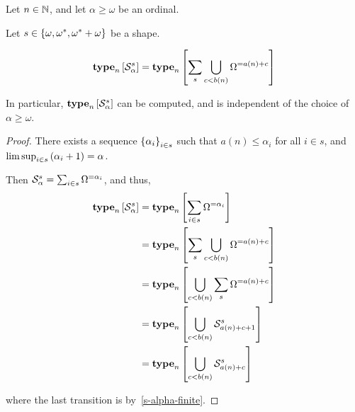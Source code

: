 \begin{corollary}
    Let $n \in \mathbb{N}$, and let $\alpha \ge \omega$ be an ordinal.

    Let $s \in \left\{ {\omega, \omega^\ast, \omega^\ast + \omega} \right\}$ be a shape.

    \[
        \mathbf{type}_{n} \left[ {\mathcal{S}^{s}_{\alpha}} \right]
        = \mathbf{type}_{n} \left[ {\sum_{s} {\bigcup_{c < b(n)}{\Omega^{= a(n) + c}}}} \right]
    \]

    In particular, $\mathbf{type}_{n} \left[ {\mathcal{S}^{s}_{\alpha}} \right]$ can be
    computed, and is independent of the choice of $\alpha \ge \omega$.
\end{corollary}

\begin{proof}
    There exists a sequence $\left\{ {\alpha_i} \right\}_{i \in s}$ such that
    $a(n) \le \alpha_i$ for all $i \in s$,
    and $\limsup_{i \in s} \left( {\alpha_i + 1} \right) = \alpha$.

    Then $\mathcal{S}^{s}_{\alpha} = \sum_{i \in s} \Omega^{= \alpha_i}$,
    and thus,
    \begin{align*}
        \mathbf{type}_{n} \left[ {\mathcal{S}^{s}_{\alpha}} \right]
        &= \mathbf{type}_{n} \left[ {\sum_{i \in s} \Omega^{= \alpha_i}} \right] \\
        &= \mathbf{type}_{n} \left[ {\sum_{s} \bigcup_{c < b(n)}{\Omega^{= a(n) + c}}} \right] \\
        &= \mathbf{type}_{n} \left[ {\bigcup_{c < b(n)}{\sum_{s} \Omega^{= a(n) + c}}} \right] \\
        &= \mathbf{type}_{n} \left[ {\bigcup_{c < b(n)}{\mathcal{S}^{s}_{a(n) + c + 1}}} \right] \\
        &= \mathbf{type}_{n} \left[ {\bigcup_{c < b(n)}{\mathcal{S}^{s}_{a(n) + c}}} \right] \\
    \end{align*}

    where the last transition is by~\cref{s-alpha-finite}.

\end{proof}


